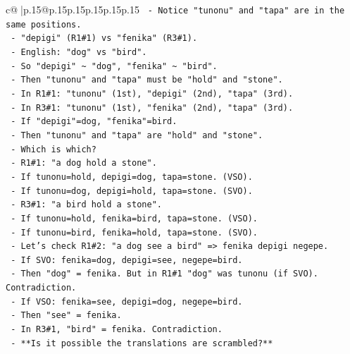 \documentclass{article}
\begin{document}
{\begin{supertabular}{c@{$\;$}|p{.15\linewidth}@{}p{.15\linewidth}p{.15\linewidth}p{.15\linewidth}p{.15\linewidth}p{.15\linewidth}}
{{{\texttt{            {-} Notice "tunonu" and "tapa" are in the same positions.} \\
\texttt{            {-} "depigi" (R1\#1) vs "fenika" (R3\#1).} \\
\texttt{            {-} English: "dog" vs "bird".} \\
\texttt{            {-} So "depigi" \textasciitilde{} "dog", "fenika" \textasciitilde{} "bird".} \\
\texttt{            {-} Then "tunonu" and "tapa" must be "hold" and "stone".} \\
\texttt{            {-} In R1\#1: "tunonu" (1st), "depigi" (2nd), "tapa" (3rd).} \\
\texttt{            {-} In R3\#1: "tunonu" (1st), "fenika" (2nd), "tapa" (3rd).} \\
\texttt{            {-} If "depigi"=dog, "fenika"=bird.} \\
\texttt{            {-} Then "tunonu" and "tapa" are "hold" and "stone".} \\
\texttt{            {-} Which is which?} \\
\texttt{            {-} R1\#1: "a dog hold a stone".} \\
\texttt{              {-} If tunonu=hold, depigi=dog, tapa=stone. (VSO).} \\
\texttt{              {-} If tunonu=dog, depigi=hold, tapa=stone. (SVO).} \\
\texttt{            {-} R3\#1: "a bird hold a stone".} \\
\texttt{              {-} If tunonu=hold, fenika=bird, tapa=stone. (VSO).} \\
\texttt{              {-} If tunonu=bird, fenika=hold, tapa=stone. (SVO).} \\
\texttt{            {-} Let's check R1\#2: "a dog see a bird" => fenika depigi negepe.} \\
\texttt{              {-} If SVO: fenika=dog, depigi=see, negepe=bird.} \\
\texttt{                {-} Then "dog" = fenika. But in R1\#1 "dog" was tunonu (if SVO). Contradiction.} \\
\texttt{              {-} If VSO: fenika=see, depigi=dog, negepe=bird.} \\
\texttt{                {-} Then "see" = fenika.} \\
\texttt{                {-} In R3\#1, "bird" = fenika. Contradiction.} \\
\texttt{      {-} **Is it possible the translations are scrambled?**} \\
}}}
\end{supertabular}}
\end{document}
